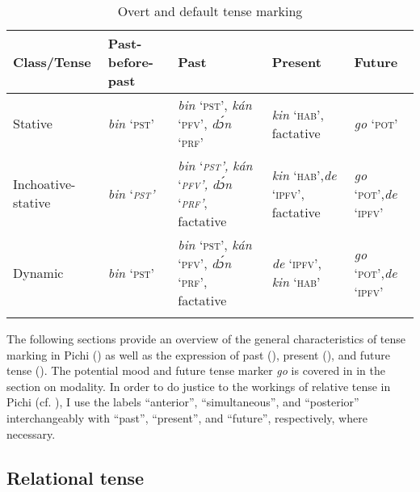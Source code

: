 \begin{table}
\caption{Overt and default tense marking}
\label{tab:key:6.7}

\begin{tabularx}{\textwidth}{QlQQQ}
\lsptoprule
Class/Tense & Past-before-past & Past & Present & Future\\
\midrule 
Stative & \textit{bin} ‘\textsc{pst}’ & \textit{bin} ‘\textsc{pst}’, \textit{kán} ‘\textsc{pfv}’, \textit{dɔ́n} ‘\textsc{prf’} & \textit{kin} ‘\textsc{hab’}, factative & \textit{go} ‘\textsc{pot}’\\
\tablevspace
Inchoative-stative & \textit{bin} {{‘}}\textit{\textsc{pst’}} & \textit{bin} {{‘}}\textit{\textsc{pst’}}\textit{, }\textit{kán} {{‘}}\textit{\textsc{pfv’}}\textit{, }\textit{dɔ́n} {{‘}}\textit{\textsc{prf’}}{{, factative}} & \textit{kin} ‘\textsc{hab’},\newline  \textit{de} ‘\textsc{ipfv’}, factative & \textit{go} ‘\textsc{pot’},\newline  \textit{de} ‘\textsc{ipfv’}\\
\tablevspace
Dynamic & \textit{bin} ‘\textsc{pst}’ & \textit{bin} ‘\textsc{pst}’, \textit{kán} ‘\textsc{pfv}’, \textit{dɔ́n} ‘\textsc{prf’}, factative & \textit{de} ‘\textsc{ipfv’}, \textit{kin} ‘\textsc{hab’} & \textit{go} ‘\textsc{pot}’,\newline \textit{de} ‘\textsc{ipfv}’\\
\lspbottomrule
\end{tabularx}
\end{table}
The following sections provide an overview of the general characteristics of tense marking in Pichi () as well as the expression of past (), present (), and future tense (). The potential mood and future tense marker \textit{go} is covered in  in the section on modality. In order to do justice to the workings of relative tense in Pichi (cf. ), I use the labels “anterior”, “simultaneous”, and “posterior” interchangeably with “past”, “present”, and “future”, respectively, where necessary.

\subsection{Relational tense}\label{sec:6.5.1}

